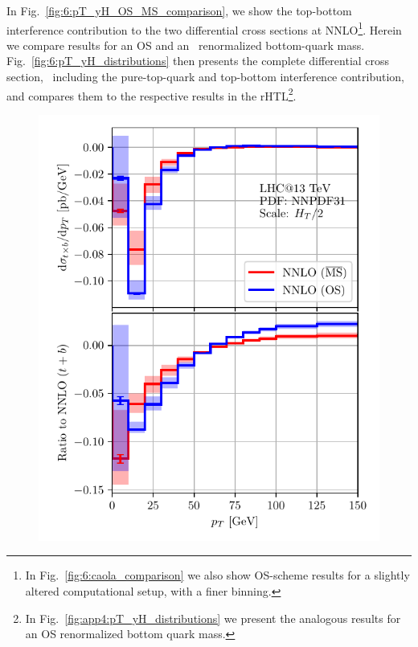 In Fig.~\ref{fig:6:pT_yH_OS_MS_comparison}, we show the top-bottom interference contribution to the two differential cross sections at \acs{NNLO}\footnote{In Fig.~\ref{fig:6:caola_comparison} we also show \acs{OS}-scheme results for a slightly altered computational setup, with a finer binning.}. Herein we compare results for an \acs{OS} and an \MS\ renormalized bottom-quark mass. Fig.~\ref{fig:6:pT_yH_distributions} then presents the complete differential cross section, \ie\ including the pure-top-quark and top-bottom interference contribution, and compares them to the respective results in the \acs{rHTL}\footnote{In Fig.~\ref{fig:app4:pT_yH_distributions} we present the analogous results for an \acs{OS} renormalized bottom quark mass.}.
\begin{figure}[ht]
\begin{minipage}[t]{0.49\textwidth}
  \includegraphics[width=\textwidth]{Images/pT_MS_OS_comparison_13000.pdf}
\end{minipage}
\begin{minipage}[t]{0.49\textwidth}

\end{minipage}
\end{figure}
